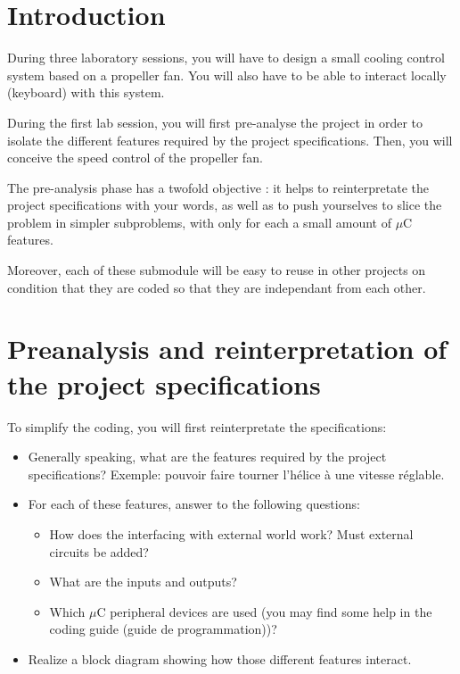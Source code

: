 \documentclass[11pt,a4paper]{article}
\theoremstyle{definition}%
\begin{document}
\section{Introduction}
During three laboratory sessions, you will have to design a small cooling control system based on a propeller fan.
You will also have to be able to interact locally (keyboard) with this system.

During the first lab session, you will first pre-analyse the project in order to isolate the different features required by the project specifications.
Then, you will conceive the speed control of the propeller fan.

The pre-analysis phase has a twofold objective : it helps to reinterpretate the project specifications with your words, as well as to push yourselves to slice the problem in simpler subproblems, with only for each a small amount of $\mu$C features.

Moreover, each of these submodule will be easy to reuse in other projects on condition that they are coded so that they are independant from each other.





\section{Preanalysis and reinterpretation of the project specifications}
To simplify the coding, you will first reinterpretate the specifications:
\begin{itemize}
	\item Generally speaking, what are the features required by the project specifications?
	Exemple: pouvoir faire tourner l’hélice à une vitesse réglable.
	\item For each of these features, answer to the following questions:
	\begin{itemize}
		\item How does the interfacing with external world work?
		Must external circuits be added?
		\item What are the inputs and outputs?
		\item Which $\mu$C peripheral devices are used (you may find some help in the coding guide (guide de programmation))?
	\end{itemize}
	\item Realize a block diagram showing how those different features interact.
\end{itemize}
\end{document}
